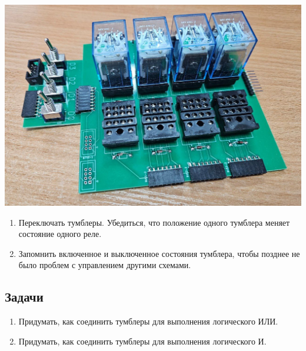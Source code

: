\includegraphics[width=0.5\columnwidth]{photo/switches.jpg}

\begin{enumerate}
    \item Переключать тумблеры. Убедиться, что положение одного тумблера меняет состояние одного реле.
    \item Запомнить включенное и выключенное состояния тумблера, чтобы позднее не было проблем с управлением другими схемами.
\end{enumerate}

\subsection{Задачи}

\begin{enumerate}
    \item Придумать, как соединить тумблеры для выполнения логического ИЛИ.
    \item Придумать, как соединить тумблеры для выполнения логического И.
\end{enumerate}
